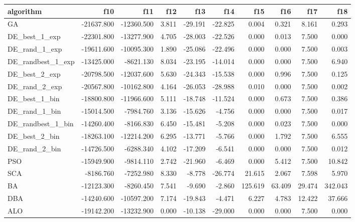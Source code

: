 \documentclass[12pt]{article}
\begin{document}
\begin{table}[H]
\begin{adjustbox}{width=1\textwidth}
    \end{adjustbox}
    
    \begin{adjustbox}{width=1\textwidth}

        \begin{tabular}{lrrrrrrrrr}
            \toprule
            algorithm &        f10 &        f11 &   f12 &     f13 &     f14 &     f15 &    f16 &    f17 &     f18 \\
            \midrule
            GA & -21637.800 & -12360.500 & 3.811 & -29.191 & -22.825 & 0.004 & 0.321 & 8.161 & 0.293 \\
            DE\_best\_1\_exp & -22301.800 & -13277.900 & 4.705 & -28.003 & -22.526 & 0.000 & 0.013 & 7.500 & 0.000 \\
            DE\_rand\_1\_exp & -19611.600 & -10095.300 & 1.890 & -25.086 & -22.496 & 0.000 & 0.000 & 7.500 & 0.003 \\
            DE\_randbest\_1\_exp & -13425.000 & -8621.130 & 8.034 & -23.195 & -14.014 & 0.000 & 0.000 & 7.500 & 6.940 \\
            DE\_best\_2\_exp & -20798.500 & -12037.600 & 5.630 & -24.343 & -15.538 & 0.000 & 0.996 & 7.500 & 0.125 \\
            DE\_rand\_2\_exp & -20567.800 & -10162.800 & 4.164 & -26.053 & -28.988 & 0.010 & 0.000 & 7.500 & 0.002 \\
            DE\_best\_1\_bin & -18800.800 & -11966.600 & 5.111 & -18.748 & -11.524 & 0.000 & 0.673 & 7.500 & 0.386 \\
            DE\_rand\_1\_bin & -15014.500 & -7984.760 & 3.136 & -15.626 & -4.756 & 0.000 & 0.000 & 7.500 & 0.017 \\
            DE\_randbest\_1\_bin & -14260.400 & -8166.830 & 6.450 & -15.481 & -5.208 & 0.000 & 0.023 & 7.500 & 0.000 \\
            DE\_best\_2\_bin & -18263.100 & -12214.200 & 6.295 & -13.771 & -5.766 & 0.000 & 1.792 & 7.500 & 6.555 \\
            DE\_rand\_2\_bin & -14726.500 & -6288.340 & 4.102 & -17.209 & -6.541 & 0.000 & 0.000 & 7.500 & 0.012 \\
            PSO & -15949.900 & -9814.110 & 2.742 & -21.960 & -6.469 & 0.000 & 5.412 & 7.500 & 10.842 \\
            SCA & -8186.760 & -7252.980 & 8.330 & -8.778 & -26.774 & 21.615 & 2.067 & 7.598 & 5.970 \\
            BA & -12123.300 & -8260.450 & 7.541 & -9.690 & -2.860 & 125.619 & 63.409 & 29.474 & 342.043 \\
            DBA & -14240.600 & -10597.200 & 7.174 & -19.843 & -4.471 & 6.227 & 4.783 & 12.422 & 37.666 \\
            ALO & -19142.200 & -13232.900 & 0.000 & -10.138 & -29.000 & 0.000 & 0.000 & 7.500 & 0.000 \\
            \bottomrule
        \end{tabular}
        

\end{adjustbox}
\end{table}
\end{document}
